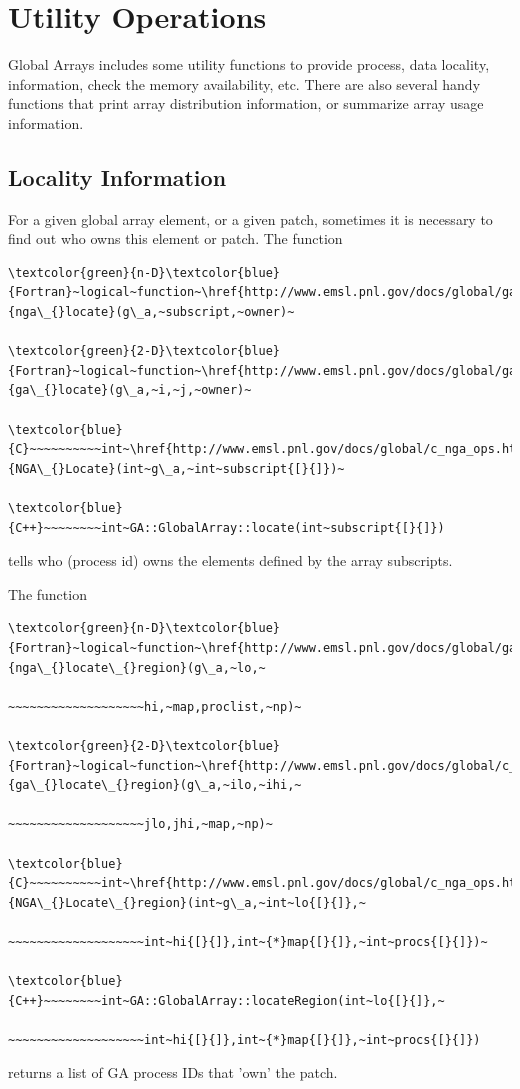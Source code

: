 \chapter{Utility Operations}

Global Arrays includes some utility functions to provide process,
data locality, information, check the memory availability, etc. There
are also several handy functions that print array distribution information,
or summarize array usage information. 


\section{Locality Information}

For a given global array element, or a given patch, sometimes it is
necessary to find out who owns this element or patch. The function
\begin{verbatim}
\textcolor{green}{n-D}\textcolor{blue}{Fortran}~logical~function~\href{http://www.emsl.pnl.gov/docs/global/ga_ops.html\#ga_locate}{nga\_{}locate}(g\_a,~subscript,~owner)~

\textcolor{green}{2-D}\textcolor{blue}{Fortran}~logical~function~\href{http://www.emsl.pnl.gov/docs/global/ga_ops.html\#ga_locate}{ga\_{}locate}(g\_a,~i,~j,~owner)~

\textcolor{blue}{C}~~~~~~~~~~int~\href{http://www.emsl.pnl.gov/docs/global/c_nga_ops.html\#ga_locate}{NGA\_{}Locate}(int~g\_a,~int~subscript{[}{]})~

\textcolor{blue}{C++}~~~~~~~~int~GA::GlobalArray::locate(int~subscript{[}{]})
\end{verbatim}
tells who (process id) owns the elements defined by the array subscripts.

The function
\begin{verbatim}
\textcolor{green}{n-D}\textcolor{blue}{Fortran}~logical~function~\href{http://www.emsl.pnl.gov/docs/global/ga_ops.html\#ga_locate_region}{nga\_{}locate\_{}region}(g\_a,~lo,~

~~~~~~~~~~~~~~~~~~~hi,~map,proclist,~np)~

\textcolor{green}{2-D}\textcolor{blue}{Fortran}~logical~function~\href{http://www.emsl.pnl.gov/docs/global/c_nga_ops.html\#ga_locate_region}{ga\_{}locate\_{}region}(g\_a,~ilo,~ihi,~

~~~~~~~~~~~~~~~~~~~jlo,jhi,~map,~np)~

\textcolor{blue}{C}~~~~~~~~~~int~\href{http://www.emsl.pnl.gov/docs/global/c_nga_ops.html\#ga_locate_region}{NGA\_{}Locate\_{}region}(int~g\_a,~int~lo{[}{]},~

~~~~~~~~~~~~~~~~~~~int~hi{[}{]},int~{*}map{[}{]},~int~procs{[}{]})~

\textcolor{blue}{C++}~~~~~~~~int~GA::GlobalArray::locateRegion(int~lo{[}{]},~

~~~~~~~~~~~~~~~~~~~int~hi{[}{]},int~{*}map{[}{]},~int~procs{[}{]})
\end{verbatim}
returns a list of GA process IDs that 'own' the patch.

